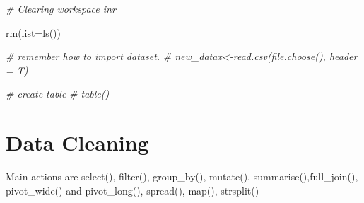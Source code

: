 \documentclass[
]{article}
\newenvironment{Shaded}{\begin{snugshade}}{\end{snugshade}}
\newcommand{\AttributeTok}[1]{\textcolor[rgb]{0.77,0.63,0.00}{#1}}
\newcommand{\CommentTok}[1]{\textcolor[rgb]{0.56,0.35,0.01}{\textit{#1}}}
\newcommand{\FunctionTok}[1]{\textcolor[rgb]{0.00,0.00,0.00}{#1}}
\newcommand{\NormalTok}[1]{#1}
\begin{document}
\begin{Shaded}
\begin{Highlighting}[]
\CommentTok{\# Clearing workspace inr}

\FunctionTok{rm}\NormalTok{(}\AttributeTok{list=}\FunctionTok{ls}\NormalTok{())}

\CommentTok{\# remember how to import dataset.}
\CommentTok{\# new\_datax\textless{}{-}read.csv(file.choose(), header = T)}

\CommentTok{\# create table}
\CommentTok{\# table()}
\end{Highlighting}
\end{Shaded}

\hypertarget{data-cleaning}{%
\section{Data Cleaning}\label{data-cleaning}}

Main actions are select(), filter(), group\_by(), mutate(), summarise(),full\_join(), pivot\_wide() and pivot\_long(), spread(), map(), strsplit()
\end{document}
